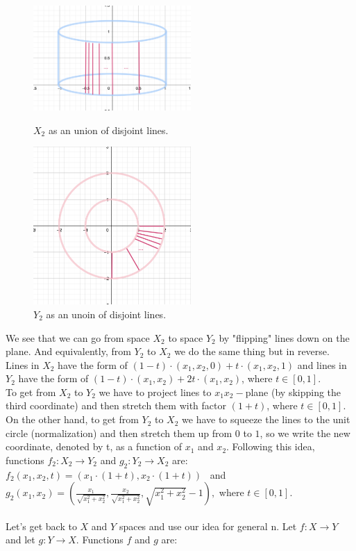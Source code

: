 \documentclass[a4paper,11pt]{article}
\begin{document}
\begin{figure}[ht!]
    \begin{minipage}{0.45\textwidth}
        \centering
        \includegraphics[width=60mm]{X_n2_lines.png}
        \caption{$X_2$ as an union of disjoint lines.}
      \end{minipage}\hfill
    \begin{minipage}{0.55\textwidth}
        \centering
        \includegraphics[width=60mm]{Y_n2_lines.png}
        \caption{$Y_2$ as an unoin of disjoint lines.}
      \end{minipage}\hfill
   \end{figure}

\noindent
We see that we can go from space $X_2$ to space $Y_2$ by "flipping" lines down on the plane. And equivalently, from $Y_2$ to $X_2$ we do the same thing but in reverse.
\\
Lines in $X_2$ have the form of $(1 - t) \cdot (x_1, x_2, 0) + t \cdot (x_1, x_2, 1)$ and lines in $Y_2$ have the form of $(1 - t) \cdot (x_1, x_2) + 2  t \cdot (x_1, x_2)$, where $ t \in [0, 1]$.
\\
To get from $X_2$ to $Y_2$ we have to project lines to $x_1 x_2-$plane (by skipping the third coordinate) and then stretch them with factor  $(1 + t)$, where $t \in [0,1]$.
On the other hand, to get from $Y_2$ to $X_2$ we have to squeeze the lines to the unit circle (normalization) and then stretch them up from $0$ to $1$, so we write the new coordinate, denoted by t, as a function of $x_1$ and $x_2$.
Following this idea, functions $f_2: X_2 \to Y_2$ and $g_2: Y_2 \to X_2$ are: \\
$f_2(x_1, x_2, t) = (x_1 \cdot (1 + t), x_2 \cdot (1 + t))$ \ and \
$g_2(x_1, x_2) = \left( \frac{x_1}{\sqrt{x_1^2 + x_2^2}}, \frac{x_2}{\sqrt{x_1^2 + x_2^2}}, \sqrt{x_1^2 + x_2^2} - 1 \right),$  where $t \in [0,1]$.
\\
\\
Let's get back to $X$ and $Y$ spaces and use our idea for general n.
Let $f: X \to Y$ and let $g: Y \to X$. Functions $f$ and $g$ are:
\end{document}
